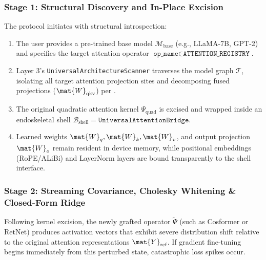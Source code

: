 \subsubsection{Stage 1: Structural Discovery and In-Place Excision}
The protocol initiates with structural introspection:
\begin{enumerate}
    \item The user provides a pre-trained base model $\mathcal{M}_{\text{base}}$ (e.g., LLaMA-7B, GPT-2) and specifies the target attention operator $\texttt{op\_name} \in \texttt{ATTENTION\_REGISTRY}$.
    \item Layer 3's \texttt{UniversalArchitectureScanner} traverses the model graph $\mathcal{T}$, isolating all target attention projection sites and decomposing fused projections ($\mat{W}_{\text{qkv}}$) per .
    \item The original quadratic attention kernel $\Psi_{\text{quad}}$ is excised and wrapped inside an endoskeletal shell $\mathcal{B}_{\text{shell}} = \texttt{UniversalAttentionBridge}$.
    \item Learned weights $\mat{W}_q, \mat{W}_k, \mat{W}_v$, and output projection $\mat{W}_o$ remain resident in device memory, while positional embeddings (RoPE/ALiBi) and LayerNorm layers are bound transparently to the shell interface.
\end{enumerate}

\subsubsection{Stage 2: Streaming Covariance, Cholesky Whitening \& Closed-Form Ridge}
Following kernel excision, the newly grafted operator $\widetilde{\Psi}$ (such as Cosformer or RetNet) produces activation vectors that exhibit severe distribution shift relative to the original attention representations $\mat{Y}_{\text{ref}}$. If gradient fine-tuning begins immediately from this perturbed state, catastrophic loss spikes occur.

